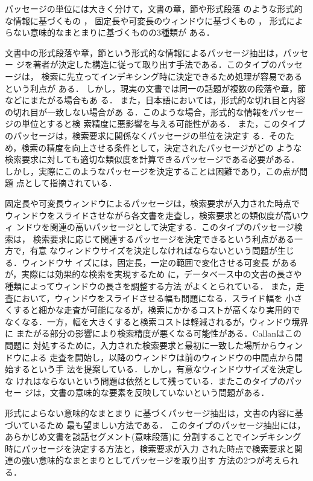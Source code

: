 パッセージの単位には大きく分けて，文書の章，節や形式段落
のような形式的な情報に基づくもの
\cite{Salton:93,Salton:94b,Moffat:94,Wilkinson:94,Mittendorf:94,Knaus:94}，
固定長や可変長のウィンドウに基づくもの
\cite{Callan:94,Kaszkiel:97,Melucci:98}，
形式によらない意味的なまとまりに基づくもの\cite{Hearst:93}の3種類が
ある．

文書中の形式段落や章，節という形式的な情報によるパッセージ抽出は，パッセー
ジを著者が決定した構造に従って取り出す手法である．このタイプのパッセージは，
検索に先立ってインデキシング時に決定できるため処理が容易であるという利点が
ある．
しかし，現実の文書では同一の話題が複数の段落や章，節などにまたがる場合もあ
る．
また，日本語においては，形式的な切れ目と内容の切れ目が一致しない場合があ
る\cite{tokoro}．このような場合，形式的な情報をパッセージの単位とすると検
索精度に悪影響を与える可能性がある．
また，このタイプのパッセージは，検索要求に関係なくパッセージの単位を決定す
る．そのため，検索の精度を向上させる条件として，決定されたパッセージがどの
ような検索要求に対しても適切な類似度を計算できるパッセージである必要がある．
しかし，実際にこのようなパッセージを決定することは困難であり，この点が問題
点として指摘されている\cite{Callan:94,Melucci:98}．

固定長や可変長ウィンドウによるパッセージは，検索要求が入力された時点で
ウィンドウをスライドさせながら各文書を走査し，検索要求との類似度が高いウィ
ンドウを関連の高いパッセージとして決定する．このタイプのパッセージ検索は，
検索要求に応じて関連するパッセージを決定できるという利点がある一方で，有意
なウィンドウサイズを決定しなければならないという問題が生じる．ウィンドウサ
イズには，固定長\cite{Callan:94,Kaszkiel:97}，一定の範囲で変化させる可変長
\cite{Kaszkiel:97,Melucci:98}があるが，実際には効果的な検索を実現するため
に，データベース中の文書の長さや種類によってウィンドウの長さを調整する方法
がよくとられている．
また，走査において，ウィンドウをスライドさせる幅も問題になる．スライド幅を
小さくすると細かな走査が可能になるが，検索にかかるコストが高くなり実用的で
なくなる．一方，幅を大きくすると検索コストは軽減されるが，ウィンドウ境界に
またがる部分の影響により検索精度が悪くなる可能性がある．Callanはこの問題に
対処するために，入力された検索要求と最初に一致した場所からウィンドウによる
走査を開始し，以降のウィンドウは前のウィンドウの中間点から開始するという手
法を提案している\cite{Callan:94}．しかし，有意なウィンドウサイズを決定しな
けれはならないという問題は依然として残っている．またこのタイプのパッセー
ジは，文書の意味的な要素を反映していないという問題がある．

形式によらない意味的なまとまり
に基づくパッセージ抽出は，文書の内容に基づいているため
最も望ましい方法である．
このタイプのパッセージ抽出には，あらかじめ文書を談話セグメント(意味段落)に
分割することでインデキシング時にパッセージを決定する方法と，検索要求が入力
された時点で検索要求と関連の強い意味的なまとまりとしてパッセージを取り出す
方法の2つが考えられる．

